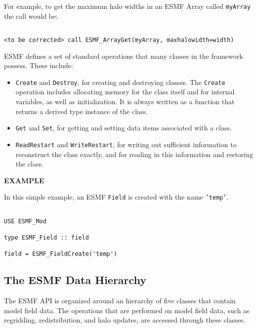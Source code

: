 For example, to get the maximum halo widths in an ESMF Array called
{\tt myArray} the call would be:

\begin{verbatim}

<to be corrected> call ESMF_ArrayGet(myArray, maxhalowidth=width)

\end{verbatim}

ESMF defines a set of standard operations that many classes 
in the framework possess.  These include:
\begin{itemize}
\item {\tt Create} and {\tt Destroy}, for creating and destroying 
classes.  The {\tt Create} operation includes allocating memory 
for the class itself and for internal variables, as well as
initialization.  It is always written as a function that returns
a derived type instance of the class.
\item {\tt Get} and {\tt Set}, for getting and setting data items 
associated with a class.
\item {\tt ReadRestart} and {\tt WriteRestart}, for writing out 
sufficient information to reconstruct the class exactly, and for 
reading in this information and restoring the class.
\end{itemize}


{\bf EXAMPLE}

In this simple example, an ESMF {\tt Field} is created with the 
name {\tt 'temp'}.  

\begin{verbatim}

USE ESMF_Mod

type ESMF_Field :: field

field = ESMF_FieldCreate('temp')

\end{verbatim}


\subsection{The ESMF Data Hierarchy}

The ESMF API is organized around an hierarchy of five classes that 
contain model field data.  The operations that are performed
on model field data, such as regridding, redistribution, and halo 
updates, are accessed through these classes.  

